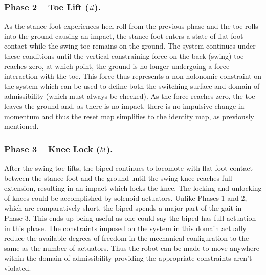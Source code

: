\subsubsection{Phase 2 -- Toe Lift ($\mathit{tl}$).}
 
As the stance foot experiences heel roll from the previous phase and the toe
rolls into the ground causing an impact, the stance foot enters a state of flat
foot contact while the swing toe remains on the ground.
% 
The system continues under these conditions until the vertical constraining
force on the back (swing) toe reaches zero, at which point, the ground is no
longer undergoing a force interaction with the toe.
% 
This force thus represents a non-holonomic constraint on the system which can be
used to define both the switching surface and domain of admissibility (which
must always be checked).
% 
As the force reaches zero, the toe leaves the ground and, as there is no impact,
there is no impulsive change in momentum and thus the reset map simplifies to
the identity map, as previously mentioned.


\subsubsection{Phase 3 -- Knee Lock ($\mathit{kl}$).}
 
After the swing toe lifts, the biped continues to locomote with flat foot
contact between the stance foot and the ground until the swing knee reaches full
extension, resulting in an impact which locks the knee.
% 
The locking and unlocking of knees could be accomplished by solenoid actuators.
% 
Unlike Phases 1 and 2, which are comparatively short, the biped spends a major
part of the gait in Phase 3.
% 
This ends up being useful as one could say the biped has full actuation in this
phase.
% 
The constraints imposed on the system in this domain actually reduce the
available degrees of freedom in the mechanical configuration to the same as the
number of actuators.
% 
Thus the robot can be made to move anywhere within the domain of admissibility
providing the appropriate constraints aren't violated.


